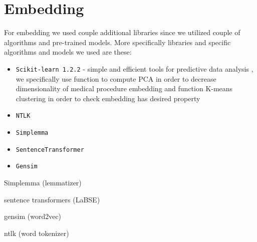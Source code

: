 
\section{Embedding}
\label{embedDesign}

For embedding we used couple additional libraries since we utilized couple of algorithms and pre-trained models. More specifically libraries and specific algorithms and models we used are these: 
\\

\begin{itemize}
	\item \texttt{Scikit-learn 1.2.2} - simple and efficient tools for predictive data analysis \cite{scikitlearn},  we specifically use function to compute PCA in order to decrease dimensionality of medical procedure embedding and function K-means clustering in order to check embedding has desired property
	
	\item \texttt{NTLK}
	
	\item \texttt{Simplemma}
	
	\item \texttt{SentenceTransformer}
	
	\item \texttt{Gensim}
\end{itemize}



Simplemma (lemmatizer)

sentence transformers (LaBSE)

gensim (word2vec)

ntlk (word tokenizer)